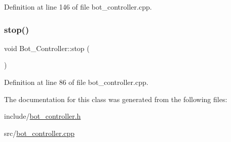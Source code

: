 Definition at line 146 of file bot\+\_\+controller.\+cpp.

\mbox{\label{class_bot___controller_a87e3ac792f943a573e676d382a816519}} 
\subsubsection{\texorpdfstring{stop()}{stop()}}
{\footnotesize\ttfamily void Bot\+\_\+\+Controller\+::stop (\begin{DoxyParamCaption}{ }\end{DoxyParamCaption})}



Definition at line 86 of file bot\+\_\+controller.\+cpp.



The documentation for this class was generated from the following files\+:\begin{DoxyCompactItemize}
\item 
include/\hyperlink{bot__controller_8h}{bot\+\_\+controller.\+h}\item 
src/\hyperlink{bot__controller_8cpp}{bot\+\_\+controller.\+cpp}\end{DoxyCompactItemize}
